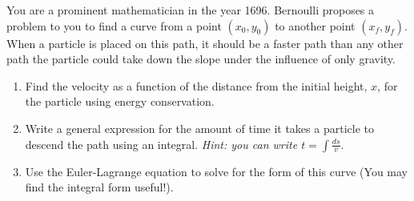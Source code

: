 \begin{exercise}[Brachistochrone]
You are a prominent mathematician in the year 1696. Bernoulli proposes a problem to you to find a curve from a point $(x_0,y_0)$ to another point $\left(x_f,y_f\right)$. When a particle is placed on this path, it should be a faster path than any other path the particle could take down the slope under the influence of only gravity.
\begin{enumerate}
    \item Find the velocity as a function of the distance from the initial height, $x$, for the particle using energy conservation.
    \item Write a general expression for the amount of time it takes a particle to descend the path using an integral. \textit{Hint: you can write $t=\int\frac{ds}{v}$}.
    \item Use the Euler-Lagrange equation to solve for the form of this curve (You may find the integral form useful!).
    \end{enumerate}
\end{exercise}
\newpage
